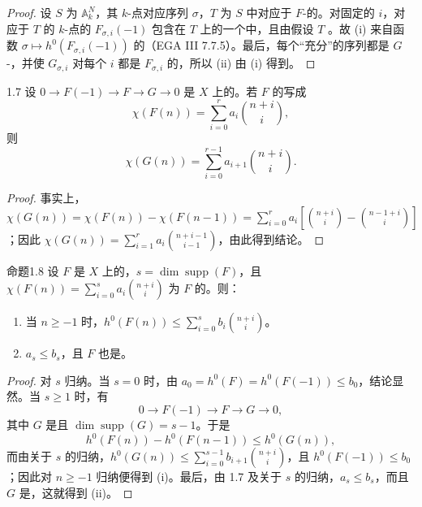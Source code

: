 \begin{proof}
设 $S$ 为 $\mathbb A_k^N$，其 $k$-点对应序列 $\sigma$，$T$ 为 $S$ 中对应于 $F$-的。对固定的 $i$，对应于 $T$ 的 $k$-点的 $F_{\sigma,i}(-1)$ 包含在 $T$ 上的一个中，且由假设 $T$ 。故 (i) 来自函数 $\sigma\mapsto h^0(F_{\sigma,i}(-1))$ 的（EGA III 7.7.5）。最后，每个“充分”的序列都是 $G$-，并使 $G_{\sigma,i}$ 对每个 $i$ 都是 $F_{\sigma,i}$ 的，所以 (ii) 由 (i) 得到。
\end{proof}
\begin{SGAresult}{}{1.7}
设 $0\to F(-1)\to F\to G\to0$ 是 $X$ 上的。若 $F$ 的写成
\[\chi(F(n))=\sum_{i=0}^r a_i\binom{n+i}{i},\]
则
\[\chi(G(n))=\sum_{i=0}^{r-1}a_{i+1}\binom{n+i}{i}.\]
\end{SGAresult}
\begin{proof}
事实上，$\chi(G(n))=\chi(F(n))-\chi(F(n-1))=\sum_{i=0}^r a_i[\binom{n+i}{i}-\binom{n-1+i}{i}]$；因此 $\chi(G(n))=\sum_{i=1}^r a_i\binom{n+i-1}{i-1}$，由此得到结论。
\end{proof}
\begin{SGAresult}{命题}{1.8}
设 $F$ 是 $X$ 上的，$s=\dim\operatorname{supp}(F)$，且 $\chi(F(n))=\sum_{i=0}^s a_i\binom{n+i}{i}$ 为 $F$ 的。则：
\begin{enumerate}
\item[(i)] 当 $n\geq-1$ 时，$h^0(F(n))\leq\sum_{i=0}^s b_i\binom{n+i}{i}$。
\item[(ii)] $a_s\leq b_s$，且 $F$ 也是。
\end{enumerate}
\end{SGAresult}
\begin{proof}
对 $s$ 归纳。当 $s=0$ 时，由 $a_0=h^0(F)=h^0(F(-1))\leq b_0$，结论显然。当 $s\geq1$ 时，有
\[0\to F(-1)\to F\to G\to0,\]
其中 $G$ 是且 $\dim\operatorname{supp}(G)=s-1$。于是
\[h^0(F(n))-h^0(F(n-1))\leq h^0(G(n)),\]
而由关于 $s$ 的归纳，$h^0(G(n))\leq\sum_{i=0}^{s-1}b_{i+1}\binom{n+i}{i}$，且 $h^0(F(-1))\leq b_0$；因此对 $n\geq-1$ 归纳便得到 (i)。最后，由 1.7 及关于 $s$ 的归纳，$a_s\leq b_s$，而且 $G$ 是，这就得到 (ii)。
\end{proof}
